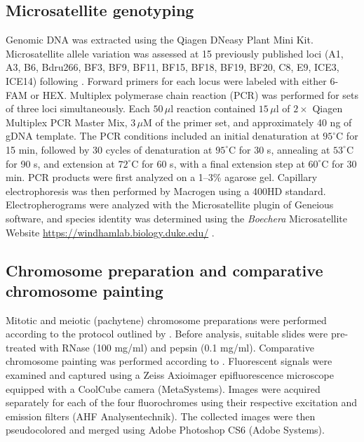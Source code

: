 \documentclass[9pt,twocolumn,twoside,lineno]{gsag3jnl}
\begin{document}
\subsection{Microsatellite genotyping}

Genomic DNA was extracted using the Qiagen DNeasy Plant Mini Kit. Microsatellite allele variation was assessed at 15 previously published loci (A1, A3, B6, Bdru266, BF3, BF9, BF11, BF15, BF18, BF19, BF20, C8, E9, ICE3, ICE14) following \cite{beck2012}. Forward primers for each locus were labeled with either 6-FAM or HEX. Multiplex polymerase chain reaction (PCR) was performed for sets of three loci simultaneously. Each \( 50 \, \mu\text{l} \) reaction contained \( 15 \, \mu\text{l} \) of \( 2\times \) Qiagen Multiplex PCR Master Mix, \( 3 \, \mu\text{M} \) of the primer set, and approximately 40 ng of gDNA template. The PCR conditions included an initial denaturation at \( 95^\circ\text{C} \) for 15 min, followed by 30 cycles of denaturation at \( 95^\circ\text{C} \) for 30 s, annealing at \( 53^\circ\text{C} \) for 90 s, and extension at \( 72^\circ\text{C} \) for 60 s, with a final extension step at \( 60^\circ\text{C} \) for 30 min. PCR products were first analyzed on a 1--3\% agarose gel. Capillary electrophoresis was then performed by Macrogen using a 400HD standard. Electropherograms were analyzed with the Microsatellite plugin of Geneious software, and species identity was determined using the \textit{Boechera} Microsatellite Website \url{https://windhamlab.biology.duke.edu/} \citep{li2017}.

\subsection{Chromosome preparation and comparative chromosome painting}

Mitotic and meiotic (pachytene) chromosome preparations were performed according to the protocol outlined by \cite{mandakova2016chromosome}. Before analysis, suitable slides were pre-treated with RNase (100 mg/ml) and pepsin (0.1 mg/ml). Comparative chromosome painting was performed according to \cite{mandakova2020chromosomal}. Fluorescent signals were examined and captured using a Zeiss Axioimager epifluorescence microscope equipped with a CoolCube camera (MetaSystems). Images were acquired separately for each of the four fluorochromes using their respective excitation and emission filters (AHF Analysentechnik). The collected images were then pseudocolored and merged using Adobe Photoshop CS6 (Adobe Systems).
\end{document}
